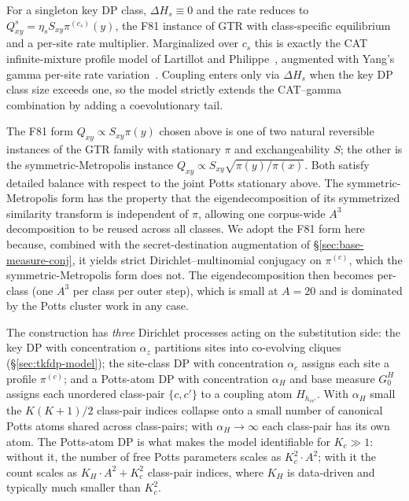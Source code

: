 \begin{remark}
For a singleton key DP class, $\Delta H_s \equiv 0$ and the rate
reduces to $Q^s_{xy} = \eta_s S_{xy} \pi^{(c_s)}(y)$, the F81
instance of GTR with class-specific equilibrium and a per-site rate
multiplier. Marginalized over $c_s$ this is exactly the CAT
infinite-mixture profile model of Lartillot and
Philippe~\citep{lartillotcat}, augmented with Yang's gamma per-site
rate variation~\citep{Yang1994a}. Coupling enters only via
$\Delta H_s$ when the key DP class size exceeds one, so the model
strictly extends the CAT--gamma combination by adding a
coevolutionary tail.
\end{remark}

\begin{remark}
The F81 form $Q_{xy} \propto S_{xy} \pi(y)$ chosen above is one of
two natural reversible instances of the GTR family with stationary
$\pi$ and exchangeability $S$; the other is the symmetric-Metropolis
instance $Q_{xy} \propto S_{xy} \sqrt{\pi(y)/\pi(x)}$. Both satisfy
detailed balance with respect to the joint Potts stationary above.
The symmetric-Metropolis form has the property that the
eigendecomposition of its symmetrized similarity transform is
independent of $\pi$, allowing one corpus-wide $A^3$ decomposition
to be reused across all classes. We adopt the F81 form here because,
combined with the secret-destination augmentation of
\S\ref{sec:base-measure-conj}, it yields strict
Dirichlet--multinomial conjugacy on $\pi^{(c)}$, which the
symmetric-Metropolis form does not. The eigendecomposition then
becomes per-class (one $A^3$ per class per outer step), which is
small at $A = 20$ and is dominated by the Potts cluster work in any
case.
\end{remark}

\begin{remark}
The construction has \emph{three} Dirichlet processes acting on the
substitution side: the key DP with concentration $\alpha_z$
partitions sites into co-evolving cliques (\S\ref{sec:tkfdp-model});
the site-class DP with concentration $\alpha_c$ assigns each site a
profile $\pi^{(c)}$; and a Potts-atom DP with concentration
$\alpha_H$ and base measure $G_0^H$ assigns each unordered class-pair
$\{c, c'\}$ to a coupling atom $H_{h_{cc'}}$. With $\alpha_H$ small
the $K(K+1)/2$ class-pair indices collapse onto a small number of
canonical Potts atoms shared across class-pairs; with
$\alpha_H \to \infty$ each class-pair has its own atom. The
Potts-atom DP is what makes the model identifiable for $K_c \gg 1$:
without it, the number of free Potts parameters scales as
$K_c^2 \cdot A^2$; with it the count scales as
$K_H \cdot A^2 + K_c^2$ class-pair indices, where $K_H$ is
data-driven and typically much smaller than $K_c^2$.
\end{remark}

